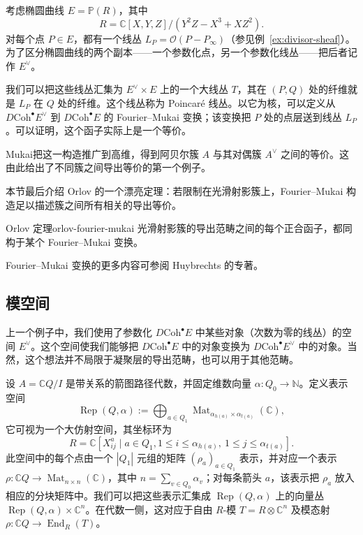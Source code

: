 \begin{example}
考虑椭圆曲线 $E=\mathbb P(R)$，其中
\[
  R=\mathbb C[X,Y,Z]/(Y^2Z-X^3+XZ^2).
\]
对每个点 $P\in E$，都有一个线丛 $L_P=\mathcal O(P-P_\infty)$（参见例~\ref{ex:divisor-sheaf}）。为了区分椭圆曲线的两个副本——一个参数化点，另一个参数化线丛——把后者记作 $E^\vee$。

我们可以把这些线丛汇集为 $E^\vee\times E$ 上的一个大线丛 $T$，其在 $(P,Q)$ 处的纤维就是 $L_P$ 在 $Q$ 处的纤维。这个线丛称为 Poincaré 线丛。以它为核，可以定义从 $D\mathrm{Coh}^{\bullet}E^\vee$ 到 $D\mathrm{Coh}^{\bullet}E$ 的 Fourier--Mukai 变换；该变换把 $P$ 处的点层送到线丛 $L_P$。可以证明，这个函子实际上是一个等价。

Mukai把这一构造推广到高维，得到阿贝尔簇 $A$ 与其对偶簇 $A^\vee$ 之间的等价。这由此给出了不同簇之间导出等价的第一个例子。
\end{example}

本节最后介绍 Orlov 的一个漂亮定理：若限制在光滑射影簇上，Fourier--Mukai 构造足以描述簇之间所有相关的导出等价。

\begin{theorem}{Orlov 定理}{orlov-fourier-mukai}
光滑射影簇的导出范畴之间的每个正合函子，都同构于某个 Fourier--Mukai 变换。
\end{theorem}

Fourier--Mukai 变换的更多内容可参阅 Huybrechts 的专著。

\subsection{模空间}\label{subsec:moduli-spaces}
上一个例子中，我们使用了参数化 $D\mathrm{Coh}^{\bullet}E$ 中某些对象（次数为零的线丛）的空间 $E^\vee$。这个空间使我们能够把 $D\mathrm{Coh}^{\bullet}E$ 中的对象变换为 $D\mathrm{Coh}^{\bullet}E^\vee$ 中的对象。当然，这个想法并不局限于凝聚层的导出范畴，也可以用于其他范畴。

设 $A=\mathbb C Q/I$ 是带关系的箭图路径代数，并固定维数向量 $\alpha\colon Q_0\to\mathbb N$。定义表示空间
\[
  \operatorname{Rep}(Q,\alpha)
  :=\bigoplus_{a\in Q_1}\operatorname{Mat}_{\alpha_{h(a)}\times\alpha_{t(a)}}(\mathbb C),
\]
它可视为一个大仿射空间，其坐标环为
\[
  R=\mathbb C[X^a_{ij}\mid a\in Q_1,
       1\leq i\leq\alpha_{h(a)},\ 1\leq j\leq\alpha_{t(a)}].
\]
此空间中的每个点由一个 $|Q_1|$ 元组的矩阵 $(\rho_a)_{a\in Q_1}$ 表示，并对应一个表示 $\rho\colon\mathbb C Q\to\operatorname{Mat}_{n\times n}(\mathbb C)$，其中 $n=\sum_{v\in Q_0}\alpha_v$；对每条箭头 $a$，该表示把 $\rho_a$ 放入相应的分块矩阵中。我们可以把这些表示汇集成 $\operatorname{Rep}(Q,\alpha)$ 上的向量丛 $\operatorname{Rep}(Q,\alpha)\times\mathbb C^n$。在代数一侧，这对应于自由 $R$-模 $T=R\otimes\mathbb C^n$ 及模态射 $\rho\colon\mathbb C Q\to\operatorname{End}_R(T)$。

